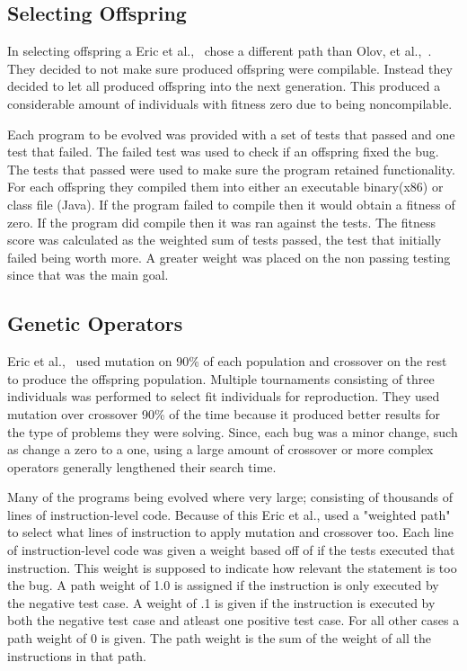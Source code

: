\documentclass{sig-alternate}
\begin{document}
\subsection{Selecting Offspring } 
In selecting offspring a Eric et al.,~\cite{Assembly:2010} chose a different path than Olov, et al.,~\cite{FINCH:2011}. They decided to not make sure produced offspring were compilable. Instead they decided to let all produced offspring into the next generation. This produced a considerable amount of individuals with fitness zero due to being noncompilable.

Each program to be evolved was provided with a set of tests that passed and one test that failed. The failed test was used to check if an offspring fixed the bug. The tests that passed were used to make sure the program retained functionality. For each offspring they compiled them into either an executable binary(x86) or class file (Java). If the program failed to compile then it would obtain a fitness of zero. If the program did compile then it was ran against the tests. The fitness score was calculated as the weighted sum of tests passed, the test that initially failed being worth more. A greater weight was placed on the non passing testing since that was the main goal.



\subsection{Genetic Operators}
Eric et al.,~\cite{Assembly:2010} used mutation on 90\% of each population and crossover on the rest to produce the offspring population. Multiple tournaments consisting of three individuals was performed to select fit individuals for reproduction. They used mutation over crossover 90\% of the time because it produced better results for the type of problems they were solving. Since, each bug was a minor change, such as change a zero to a one, using a large amount of crossover or more complex operators generally lengthened their search time.

Many of the programs being evolved where very large; consisting of thousands of lines of instruction-level code. Because of this Eric et al., used a "weighted path" to select what lines of instruction to apply mutation and crossover too. Each line of instruction-level code was given a weight based off of if the tests executed that instruction. This weight is supposed to indicate how relevant the statement is too the bug. A path weight of 1.0 is assigned if the instruction is only executed by the negative test case. A weight of .1 is given if the instruction is executed by both the negative test case and atleast one positive test case. For all other cases a path weight of 0 is given. The path weight is the sum of the weight of all the instructions in that path. 
\end{document}
